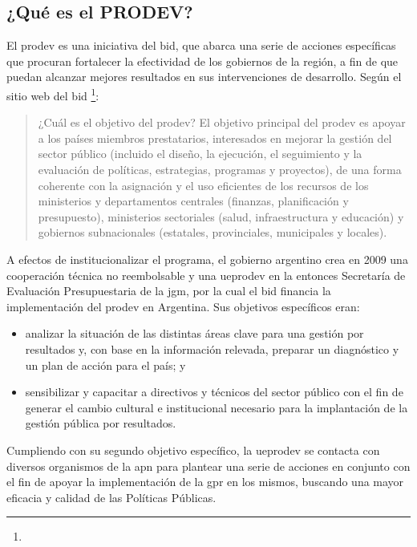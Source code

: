\newpage
\subsection{¿Qué es el PRODEV?} \label{prodev}

El \ac{prodev} es una iniciativa del \ac{bid}, que  abarca una serie de acciones específicas que procuran fortalecer la efectividad de los gobiernos de la región, a fin de que puedan alcanzar mejores resultados en sus intervenciones de desarrollo.
Según el sitio web del \ac{bid} \footnote{}:

\begin{quote}
\small ¿Cuál es el objetivo del \ac{prodev}? El objetivo principal del \ac{prodev} es apoyar a los países miembros prestatarios, interesados en mejorar la gestión del sector público (incluido el diseño, la ejecución, el seguimiento y la evaluación de políticas, estrategias, programas y proyectos), de una forma coherente con la asignación y el uso eficientes de los recursos de los ministerios y departamentos centrales (finanzas, planificación y presupuesto), ministerios sectoriales (salud, infraestructura y educación) y gobiernos subnacionales (estatales, provinciales, municipales y locales).  
\end{quote}

A efectos de institucionalizar el programa, el gobierno argentino crea en 2009 una cooperación técnica no reembolsable y una \ac{ueprodev} en la entonces Secretaría de Evaluación Presupuestaria de la \ac{jgm}, por la cual el \ac{bid} financia la implementación del \ac{prodev} en Argentina. Sus objetivos específicos eran:  
    \begin{itemize}
        \item analizar la situación de las distintas áreas clave para una gestión por resultados y, con base en la información relevada, preparar un diagnóstico y un plan de acción para el país; y 
        \item sensibilizar y capacitar a directivos y técnicos del sector público con el fin de generar el cambio cultural e institucional necesario para la implantación de la gestión pública por resultados. 
    \end{itemize}

Cumpliendo con su segundo objetivo específico, la \ac{ueprodev} se contacta con diversos organismos de la \ac{apn} para plantear una serie de acciones en conjunto con el fin de apoyar la implementación de la \ac{gpr} en los mismos, buscando una mayor eficacia y calidad de las Políticas Públicas.

